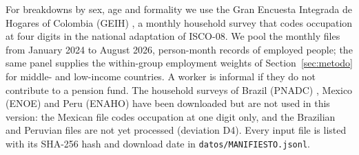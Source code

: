 For breakdowns by sex, age and formality we use the Gran Encuesta Integrada de Hogares of Colombia (GEIH) \citep{dane2026geih}, a monthly household survey that codes occupation at four digits in the national adaptation of ISCO-08.
We pool the  monthly files from January 2024 to August 2026,  person-month records of employed people; the same panel supplies the within-group employment weights of Section~\ref{sec:metodo} for middle- and low-income countries.
A worker is informal if they do not contribute to a pension fund.
The household surveys of Brazil (PNADC) \citep{ibge2026pnadc}, Mexico (ENOE) \citep{inegi2026enoe} and Peru (ENAHO) \citep{inei2026enaho} have been downloaded but are not used in this version: the Mexican file codes occupation at one digit only, and the Brazilian and Peruvian files are not yet processed (deviation D4).
Every input file is listed with its SHA-256 hash and download date in \texttt{datos/MANIFIESTO.jsonl}.
